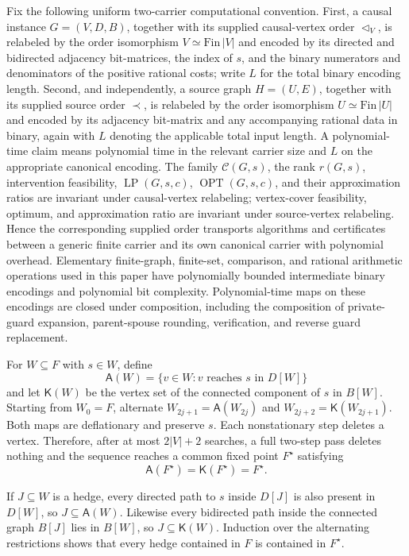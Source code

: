 Fix the following uniform two-carrier computational convention.  First, a
causal instance \(G=(V,D,B)\), together with its supplied causal-vertex
order \(\triangleleft_V\), is relabeled by the order isomorphism
\(V\simeq\mathrm{Fin}\,|V|\) and encoded by its directed and bidirected
adjacency bit-matrices, the index of \(s\), and the binary numerators and
denominators of the positive rational costs; write \(L\) for the total
binary encoding length.  Second, and independently, a source graph
\(H=(U,E)\), together with its supplied source order \(\prec\), is relabeled
by the order isomorphism \(U\simeq\mathrm{Fin}\,|U|\) and encoded by its
adjacency bit-matrix and any accompanying rational data in binary, again
with \(L\) denoting the applicable total input length.  A polynomial-time
claim means polynomial time in the relevant carrier size and \(L\) on the
appropriate canonical encoding.  The family \(\mathcal C(G,s)\), the rank
\(r(G,s)\), intervention feasibility, \(\operatorname{LP}(G,s,c)\),
\(\operatorname{OPT}(G,s,c)\), and their approximation ratios are invariant
under causal-vertex relabeling; vertex-cover feasibility, optimum, and
approximation ratio are invariant under source-vertex relabeling.  Hence the
corresponding supplied order transports algorithms and certificates between
a generic finite carrier and its own canonical carrier with polynomial
overhead.  Elementary finite-graph, finite-set, comparison, and rational
arithmetic operations used in this paper have polynomially bounded
intermediate binary encodings and polynomial bit complexity.  Polynomial-time
maps on these encodings are closed under composition, including the
composition of private-guard expansion, parent-spouse rounding, verification,
and reverse guard replacement.

For \(W\subseteq F\) with \(s\in W\), define
\[
 \mathsf A(W)=\{v\in W:v\text{ reaches }s\text{ in }D[W]\}
\]
and let \(\mathsf K(W)\) be the vertex set of the connected component of
\(s\) in \(B[W]\).  Starting from \(W_0=F\), alternate
\(W_{2j+1}=\mathsf A(W_{2j})\) and
\(W_{2j+2}=\mathsf K(W_{2j+1})\).  Both maps are deflationary and preserve
\(s\).  Each nonstationary step deletes a vertex.  Therefore, after at most
\(2|V|+2\) searches, a full two-step pass deletes nothing and the sequence
reaches a common fixed point \(F^{\star}\) satisfying
\[
 \mathsf A(F^{\star})=\mathsf K(F^{\star})=F^{\star}.
\]

If \(J\subseteq W\) is a hedge, every directed path to \(s\) inside
\(D[J]\) is also present in \(D[W]\), so \(J\subseteq\mathsf A(W)\).
Likewise every bidirected path inside the connected graph \(B[J]\) lies in
\(B[W]\), so \(J\subseteq\mathsf K(W)\).  Induction over the alternating
restrictions shows that every hedge contained in \(F\) is contained in
\(F^{\star}\).

